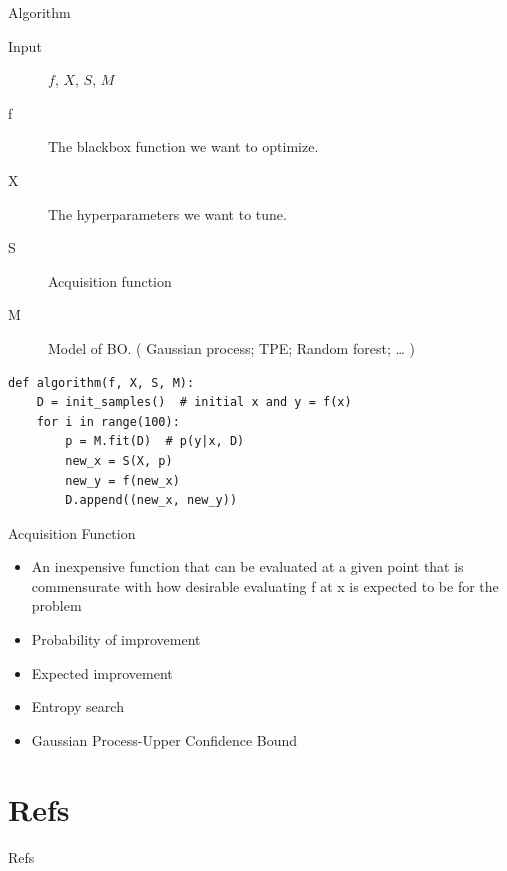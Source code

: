 \documentclass[aspectratio=1610,xcolor={dvipsnames},hyperref={colorlinks,unicode,linkcolor=violet,anchorcolor=BlueViolet,citecolor=YellowOrange,filecolor=black,urlcolor=Aquamarine}]{beamer}
\begin{document}
\begin{frame}[label={sec:orgf2a9dac},fragile]{Algorithm}
 \begin{description}
\item[{Input}] \(f\), \(X\), \(S\), \(M\)
\item[{f}] The blackbox function we want to optimize.
\item[{X}] The hyperparameters we want to tune.
\item[{S}] Acquisition function
\item[{M}] Model of BO.  ( Gaussian process; TPE; Random forest; \ldots{} )
\end{description}

\begin{verbatim}
def algorithm(f, X, S, M):
    D = init_samples()  # initial x and y = f(x)
    for i in range(100):
        p = M.fit(D)  # p(y|x, D)
        new_x = S(X, p)
        new_y = f(new_x)
        D.append((new_x, new_y))
\end{verbatim}
\end{frame}

\begin{frame}[label={sec:org5c06010}]{Acquisition Function}
\begin{itemize}
\item An inexpensive function that can be evaluated at a given point that is commensurate with how desirable evaluating f at x is expected to be for the problem
\item Probability of improvement
\item Expected improvement
\item Entropy search
\item Gaussian Process-Upper Confidence Bound
\end{itemize}
\end{frame}

\section{Refs}
\label{sec:org9a854c5}

\begin{frame}[allowframebreaks]{Refs}
\printbibliography
\end{frame}
\end{document}
